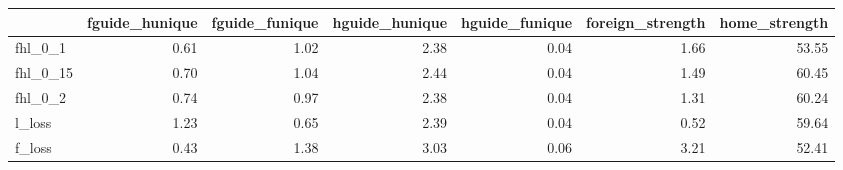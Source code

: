 \begin{tabular}{lrrrrrr}
\toprule
 & fguide_hunique & fguide_funique & hguide_hunique & hguide_funique & foreign_strength & home_strength \\
\midrule
fhl_0_1 & 0.61 & 1.02 & 2.38 & 0.04 & 1.66 & 53.55 \\
fhl_0_15 & 0.70 & 1.04 & 2.44 & 0.04 & 1.49 & 60.45 \\
fhl_0_2 & 0.74 & 0.97 & 2.38 & 0.04 & 1.31 & 60.24 \\
l_loss & 1.23 & 0.65 & 2.39 & 0.04 & 0.52 & 59.64 \\
f_loss & 0.43 & 1.38 & 3.03 & 0.06 & 3.21 & 52.41 \\
\bottomrule
\end{tabular}
